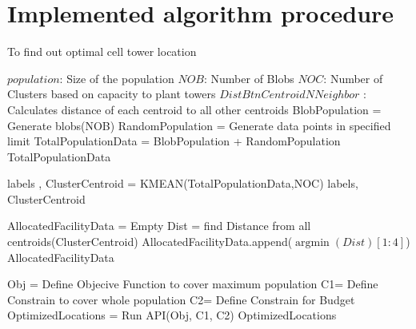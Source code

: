 \documentclass[preprint,12pt]{elsarticle}
\DeclareMathOperator*{\argmin}{argmin}
\begin{document}
\newpage

\section{Implemented algorithm procedure}\label{sec:algo}
	\begin{algorithm}[H]
		\caption{ To find out optimal cell tower location}\label{alg:algo}
		\begin{algorithmic}[1]
			
			\State $population$: Size of the population		
			\State $NOB$: Number of Blobs
			\State $NOC$: Number of Clusters based on capacity to plant towers
			\State $DistBtnCentroidNNeighbor$ : Calculates distance of each centroid to all other centroids
			\vspace{1mm} 
			\State BlobPopulation = Generate blobs(NOB)  
			\State RandomPopulation = Generate data points in specified limit 
			\State TotalPopulationData = BlobPopulation + RandomPopulation 
			\State \Return TotalPopulationData
			\EndProcedure
			\vspace{1mm}
			
			\State labels , ClusterCentroid = KMEAN(TotalPopulationData,NOC) 
			\State \Return labels, ClusterCentroid
			\EndProcedure					\vspace{1mm}
			
			
			\State AllocatedFacilityData = Empty 
				\State Dist = find Distance from all centroids(ClusterCentroid) 		
				\State AllocatedFacilityData.append($\argmin(Dist)[1:4]$) 	
			\EndFor
			\State \Return AllocatedFacilityData
			\EndProcedure
		\vspace{1mm}			
		
		\State {}
		\State Obj = Define Objecive Function to cover maximum population
		\State C1= Define Constrain to cover whole population 
		\State C2= Define Constrain for Budget 
		\State OptimizedLocations = Run API(Obj, C1, C2)
		\State \Return OptimizedLocations
		\EndProcedure
		

\end{algorithmic}
\end{algorithm}
\end{document}
